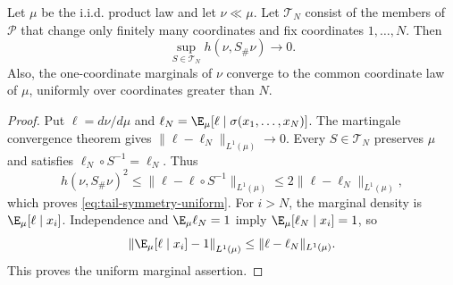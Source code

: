 \begin{lemma}
\label{lem:tail-symmetry-uniform}
Let $\mu$ be the i.i.d. product law and let $\nu\ll\mu$.  Let
$\mathcal T_N$ consist of the members of $\mathcal P$ that change only
finitely many coordinates and fix coordinates $1,\ldots,N$.
Then
\begin{equation}
 \sup_{S\in\mathcal T_N}h(\nu,S_\#\nu)\longrightarrow0.
 \label{eq:tail-symmetry-uniform}
\end{equation}
Also, the one-coordinate marginals of $\nu$ converge to the common
coordinate law of $\mu$, uniformly over coordinates greater than $N$.
\end{lemma}
\begin{proof}
Put $\ell=d\nu/d\mu$ and
$\ell_N=\E_\mu[\ell\mid\sigma(x_1,\ldots,x_N)]$.  The martingale
convergence theorem gives $\|\ell-\ell_N\|_{L^1(\mu)}\to0$.
Every $S\in\mathcal T_N$ preserves $\mu$ and satisfies
$\ell_N\circ S^{-1}=\ell_N$.  Thus
\[
 h(\nu,S_\#\nu)^2
 \leq\|\ell-\ell\circ S^{-1}\|_{L^1(\mu)}
 \leq2\|\ell-\ell_N\|_{L^1(\mu)},
\]
which proves \eqref{eq:tail-symmetry-uniform}.
For $i>N$, the marginal density is
$\E_\mu[\ell\mid x_i]$.  Independence and $\E_\mu\ell_N=1$ imply
$\E_\mu[\ell_N\mid x_i]=1$, so
\[
 \left\|\E_\mu[\ell\mid x_i]-1\right\|_{L^1(\mu)}
 \leq\|\ell-\ell_N\|_{L^1(\mu)}.
\]
This proves the uniform marginal assertion.
\end{proof}

